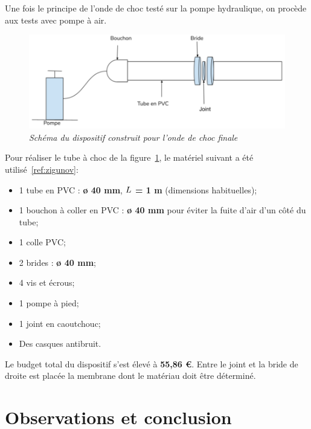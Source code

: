 \subsubsection{}
Une fois le principe de l'onde de choc testé sur la pompe hydraulique, on procède aux tests avec pompe à air.
\begin{figure}[H]
	\centering
	\includegraphics[scale = 0.4]{figures/choc_air.png}
	\caption{\small{\textit{Schéma du dispositif construit pour l'onde de choc finale}}}
	\label{fig:choc_air}
\end{figure}
Pour réaliser le tube à choc de la figure~\ref{fig:choc_air}, le matériel suivant a été utilisé~\ref{ref:zigunov}:
\begin{itemize}
	\item 1 tube en PVC : \textbf{ø 40 mm}, \textbf{$\mathnormal{L}$ = 1 m} (dimensions habituelles);
	\item 1 bouchon à coller en PVC : \textbf{ø 40 mm} pour éviter la fuite d'air d'un côté du tube;
	\item 1 colle PVC;
	\item 2 brides : \textbf{ø 40 mm};
	\item 4 vis et écrous;
	\item 1 pompe à pied;
	\item 1 joint en caoutchouc;
	\item Des casques antibruit.
\end{itemize}
Le budget total du dispositif s'est élevé à \textbf{55,86 €}.
Entre le joint et la bride de droite est placée la membrane dont le matériau doit être déterminé. 
\section{Observations et conclusion}
